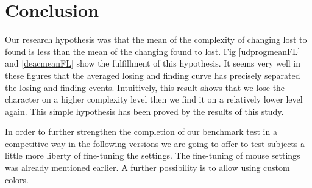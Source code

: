 \documentclass[a4paper]{article}
\begin{document}


\section{Conclusion}

Our research hypothesis was that 
the mean of the complexity of changing lost to found is less than the mean of the changing found to lost. 
Fig \ref{udprogmeanFL} and \ref{deacmeanFL} show the fulfillment of this hypothesis. 
It seems very well in these figures that the averaged losing and finding curve has precisely separated 
the losing and finding events. Intuitively, this result shows that we lose the character on a higher 
complexity level then we find it on a relatively lower level again. 
This simple hypothesis has been proved by the results of this study. 

In order to further strengthen the completion of our benchmark test in a competitive way in the  following versions we are going to offer to test subjects a little more 
liberty of fine-tuning the settings. The fine-tuning of mouse settings was already mentioned earlier. A further possibility is to allow using custom colors.
\end{document}
